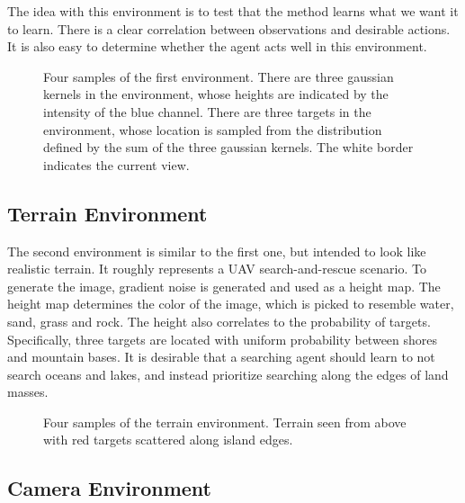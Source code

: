 The idea with this environment is to test that the method learns what we want it to learn.
There is a clear correlation between observations and desirable actions.
It is also easy to determine whether the agent acts well in this environment.


\begin{figure}
    \centering
    
    \label{fig:gaussian}
    \caption[Gaussian environment]{Four samples of the first environment. There are three gaussian kernels in the environment, whose heights are indicated by the intensity of the blue channel. There are three targets in the environment, whose location is sampled from the distribution defined by the sum of the three gaussian kernels. The white border indicates the current view.}
\end{figure}

\subsection{Terrain Environment}

The second environment is similar to the first one, but intended to look like realistic terrain.
It roughly represents a UAV search-and-rescue scenario.
To generate the image, gradient noise is generated and used as a height map.
The height map determines the color of the image, which is picked to resemble water, sand, grass and rock.
The height also correlates to the probability of targets.
Specifically, three targets are located with uniform probability between shores and mountain bases.
It is desirable that a searching agent should learn to not search oceans and lakes, and instead prioritize searching along the edges of land masses.

\begin{figure}
    \centering
    
    \label{fig:terrain}
    \caption[Terrain environment]{Four samples of the terrain environment. Terrain seen from above with red targets scattered along island edges.}
\end{figure}

\subsection{Camera Environment}

